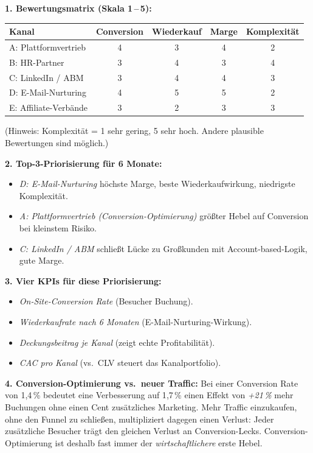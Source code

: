 \documentclass[11pt,a4paper,oneside]{article}
\begin{document}
\begin{loesungbox}
\textbf{1. Bewertungsmatrix (Skala 1\,--\,5):}

\smallskip
\begin{tabularx}{\linewidth}{@{}lcccc@{}}
\toprule
\textbf{Kanal} & \textbf{Conversion} & \textbf{Wiederkauf} & \textbf{Marge} & \textbf{Komplexität} \\
\midrule
A: Plattformvertrieb  & 4 & 3 & 4 & 2 \\
B: HR-Partner         & 3 & 4 & 3 & 4 \\
C: LinkedIn / ABM     & 3 & 4 & 4 & 3 \\
D: E-Mail-Nurturing   & 4 & 5 & 5 & 2 \\
E: Affiliate-Verbände & 3 & 2 & 3 & 3 \\
\bottomrule
\end{tabularx}

\smallskip
(Hinweis: Komplexität = 1 sehr gering, 5 sehr hoch. Andere plausible Bewertungen sind möglich.)

\smallskip
\textbf{2. Top-3-Priorisierung für 6 Monate:}
\begin{itemize}
  \item \emph{D: E-Mail-Nurturing} \textendash{} höchste Marge, beste Wiederkaufwirkung, niedrigste Komplexität.
  \item \emph{A: Plattformvertrieb (Conversion-Optimierung)} \textendash{} größter Hebel auf Conversion bei kleinstem Risiko.
  \item \emph{C: LinkedIn / ABM} \textendash{} schließt Lücke zu Großkunden mit Account-based-Logik, gute Marge.
\end{itemize}

\textbf{3. Vier KPIs für diese Priorisierung:}
\begin{itemize}
  \item \emph{On-Site-Conversion Rate} (Besucher \textrightarrow{} Buchung).
  \item \emph{Wiederkaufrate nach 6 Monaten} (E-Mail-Nurturing-Wirkung).
  \item \emph{Deckungsbeitrag je Kanal} (zeigt echte Profitabilität).
  \item \emph{CAC pro Kanal} (vs.\ CLV \textendash{} steuert das Kanalportfolio).
\end{itemize}

\textbf{4. Conversion-Optimierung vs.\ neuer Traffic:}
Bei einer Conversion Rate von 1{,}4\,\% bedeutet eine Verbesserung auf 1{,}7\,\% einen Effekt von \emph{+21\,\%} mehr Buchungen \textendash{} ohne einen Cent zusätzliches Marketing. Mehr Traffic einzukaufen, ohne den Funnel zu schließen, multipliziert dagegen einen Verlust: Jeder zusätzliche Besucher trägt den gleichen Verlust an Conversion-Lecks. Conversion-Optimierung ist deshalb fast immer der \emph{wirtschaftlichere} erste Hebel.
\end{loesungbox}
\end{document}
